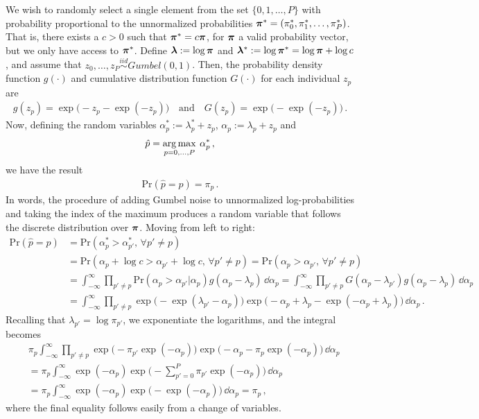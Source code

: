 \documentclass[12pt]{article} %
\newcommand{\argmax}{\operatornamewithlimits{arg\,max}}
\begin{document}
We wish to randomly select a single element from the set $\{0,1,\dots,P\}$ with probability proportional to the unnormalized probabilities $\boldsymbol{\pi}^*=(\pi_0^*,\pi_1^*,\dots,\pi_P^*)$.  That is, there exists a $c>0$ such that $\boldsymbol{\pi}^* = c \boldsymbol{\pi}$, for $\boldsymbol{\pi}$ a valid probability vector, but we only have access to $\boldsymbol{\pi}^*$.  Define $\boldsymbol{\lambda}:= \log \boldsymbol{\pi}$ and $\boldsymbol{\lambda}^*:= \log \boldsymbol{\pi}^*=\log\boldsymbol{\pi} + \log c$,  and assume that $z_0,\dots,z_P\stackrel{iid}{\sim}Gumbel(0,1)$. Then, the probability density function $g(\cdot)$ and cumulative distribution function $G(\cdot)$ for each individual $z_p$ are
\begin{align*}
	g(z_p) = \exp\big(-z_p- \exp(-z_p)\big)  \quad \mbox{and} \quad G(z_p) = \exp \big( -\exp(-z_p) \big)\, .
\end{align*}
Now, defining the random variables $\alpha^*_p:=\lambda^*_p+z_p$, $\alpha_p:=\lambda_p+z_p$ and  
\begin{align*}
	\hat{p} = \argmax_{p=0,\dots,P}\: \alpha^*_p \, ,
\end{align*}
we have the result
\begin{align*}
	\mbox{Pr} (\hat{p} = p) = \pi_p \, .
\end{align*}
In words, the procedure of adding Gumbel noise to unnormalized log-probabilities and taking the index of the maximum produces a random variable that follows the discrete distribution over $\boldsymbol{\pi}$.  Moving from left to right:
\begin{align*}
	\mbox{Pr} (\hat{p} = p) &= \mbox{Pr} (\alpha^*_p > \alpha^*_{p'}, \, \forall p' \neq p ) \\
	&= \mbox{Pr} (\alpha_p +\log c > \alpha_{p'} + \log c, \, \forall p' \neq p ) 
	= \mbox{Pr} (\alpha_p  > \alpha_{p'} , \, \forall p' \neq p ) \\
	&= \int_{-\infty}^\infty \prod_{p'\neq p} \mbox{Pr} (\alpha_p > \alpha_{p'}| \alpha_p) g(\alpha_p-\lambda_p) \, \dd \alpha_p 
	= \int_{-\infty}^\infty \prod_{p'\neq p} G(\alpha_p-\lambda_{p'}) g(\alpha_p-\lambda_p) \, \dd \alpha_p \\
	&=  \int_{-\infty}^\infty  \prod_{p'\neq p} \exp\big( -\exp(\lambda_{p'}-\alpha_p)\big) \exp\big(-\alpha_p+\lambda_p - \exp(-\alpha_p+\lambda_p) \big) \, \dd \alpha_p \, .
\end{align*}
Recalling that $\lambda_{p'}=\log \pi_{p'}$, we exponentiate the logarithms, and the integral becomes
\begin{align*}
	& \pi_p \int_{-\infty}^\infty  \prod_{p'\neq p} \exp\big( -\pi_{p'}\exp(-\alpha_p)\big) \exp  \big(-\alpha_p - \pi_p\exp(-\alpha_p) \big) \, \dd \alpha_p \\
	&= \pi_p \int_{-\infty}^\infty \exp  (-\alpha_p ) \exp\big( -\sum_{p'=0}^P\pi_{p'}\exp(-\alpha_p)\big)  \, \dd \alpha_p  \\
	&= \pi_p \int_{-\infty}^\infty \exp  (-\alpha_p ) \exp\big( -\exp(-\alpha_p)\big)  \, \dd \alpha_p  = \pi_p \, ,
\end{align*}
where the final equality follows easily from a change of variables. 
\end{document}
